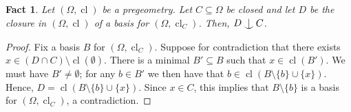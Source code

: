 \documentclass{article}
\newtheorem{fact}[theorem]{Fact}
\theoremstyle{remark}
\theoremstyle{definition}
\newcommand{\repau}[1]{\textcolor{ForestGreen}{PM: #1}}
\DeclareMathOperator{\cl}{cl}
\def\Ind#1#2{#1\setbox0=\hbox{$#1x$}\kern\wd0\hbox to 0pt{\hss$#1\mid$\hss}
	\lower.9\ht0\hbox to 0pt{\hss$#1\smile$\hss}\kern\wd0}
\def\ind{\mathop{\mathpalette\Ind{}}}
\begin{document}
{{\begin{fact}\label{fact:indpregeom} Let $(\Omega, \cl)$ be a pregeometry. Let $C\subseteq \Omega$ be closed and let $D$ be the closure in $(\Omega, \cl)$ of a basis for $(\Omega, \cl_C)$. Then, $D\ind C$. 
\end{fact}
\begin{proof} 
{Fix a basis $B$ for $(\Omega, \cl_C)$. Suppose for contradiction that there exists $x\in (D\cap C)\setminus \cl(\emptyset)$. There is a minimal $B'\subseteq B$ such that $x\in\cl(B')$. We must have $B'\neq \emptyset$; for any $b\in B'$ we then have that $b\in\cl(B\setminus\{b\}\cup\{x\})$. Hence,  
$D=\cl(B\setminus\{b\}\cup\{x\})$. Since $x\in C$, this implies that $B\setminus\{b\}$ is a basis for $(\Omega, \cl_C)$, a contradiction.}
\end{proof}



}}
\end{document}

